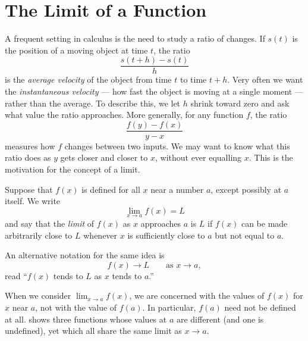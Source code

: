 \section{The Limit of a Function}

A frequent setting in calculus is the need to study a ratio of changes. If \(s(t)\) is the position of a moving object at time \(t\), the ratio
\[
\frac{s(t + h) - s(t)}{h}
\]
is the \emph{average velocity} of the object from time \(t\) to time \(t + h\). Very often we want the \emph{instantaneous velocity} --- how fast the object is moving at a single moment --- rather than the average. To describe this, we let \(h\) shrink toward zero and ask what value the ratio approaches. More generally, for any function \(f\), the ratio
\[
\frac{f(y) - f(x)}{y - x}
\]
measures how \(f\) changes between two inputs. We may want to know what this ratio does as \(y\) gets closer and closer to \(x\), without ever equalling \(x\). This is the motivation for the concept of a limit.

\begin{definition}\label{def:limit-informal}
Suppose that \(f(x)\) is defined for all \(x\) near a number \(a\), except possibly at \(a\) itself. We write
\[
\lim_{x \to a} f(x) = L
\]
and say that the \emph{limit} of \(f(x)\) as \(x\) approaches \(a\) is \(L\) if \(f(x)\) can be made arbitrarily close to \(L\) whenever \(x\) is sufficiently close to \(a\) but not equal to \(a\).
\end{definition}

An alternative notation for the same idea is
\[
f(x) \to L \qquad \text{as } x \to a,
\]
read ``\(f(x)\) tends to \(L\) as \(x\) tends to \(a\).''

When we consider \(\lim_{x \to a} f(x)\), we are concerned with the values of \(f(x)\) for \(x\) near \(a\), not with the value of \(f(a)\). In particular, \(f(a)\) need not be defined at all.  shows three functions whose values at \(a\) are different (and one is undefined), yet which all share the same limit as \(x \to a\).

